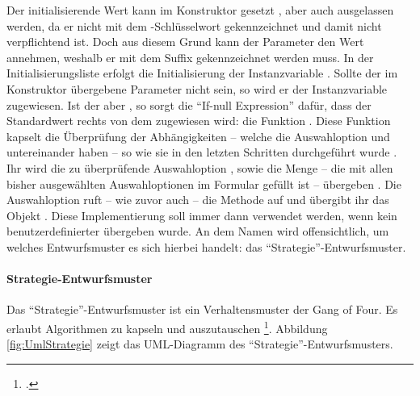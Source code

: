 Der initialisierende Wert kann im Konstruktor gesetzt ,
aber auch ausgelassen werden,
da er nicht mit dem -Schlüsselwort gekennzeichnet und damit nicht verpflichtend ist.
Doch aus diesem Grund kann der Parameter den Wert  annehmen,
weshalb er mit dem Suffix  gekennzeichnet werden muss.
In der Initialisierungsliste erfolgt die Initialisierung der Instanzvariable  .
Sollte der im Konstruktor übergebene Parameter nicht  sein,
so wird er der Instanzvariable zugewiesen.
Ist der aber ,
so sorgt die \enquote{If-null Expression} dafür,
dass der Standardwert rechts von dem  zugewiesen wird:
die Funktion  .
Diese Funktion kapselt die Überprüfung der Abhängigkeiten
-- welche die Auswahloption und untereinander haben --
so wie sie in den letzten Schritten durchgeführt wurde .
Ihr wird die zu überprüfende Auswahloption ,
sowie die Menge  -- die mit allen bisher ausgewählten Auswahloptionen im Formular gefüllt ist --
übergeben .
Die Auswahloption  ruft
-- wie zuvor auch --
die Methode  auf
und übergibt ihr das Objekt  .
Diese Implementierung soll immer dann verwendet werden, 
wenn kein benutzerdefinierter  übergeben wurde.
An dem Namen  wird offensichtlich, um welches Entwurfsmuster es sich hierbei handelt: das \enquote{Strategie}-Entwurfsmuster. 


\paragraph{Strategie-Entwurfsmuster} Das \enquote{Strategie}-Entwurfsmuster ist ein Verhaltensmuster der Gang of Four.
Es erlaubt Algorithmen zu kapseln und auszutauschen \footcite[Vgl.][S. 373]{gamma2009entwurfsmuster}.
Abbildung \ref{fig:UmlStrategie} zeigt das UML-Diagramm des \enquote{Strategie}-Entwurfsmusters. 

